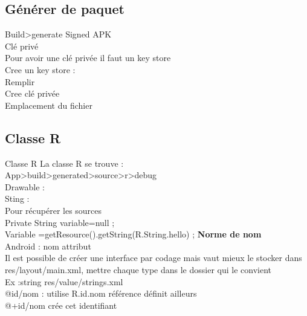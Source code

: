 \subsection{Générer de paquet}
Build>generate Signed APK\\ 
Clé privé\\
Pour avoir une clé privée il faut un key store\\
Cree un key store :\\
Remplir\\
Cree clé privée\\
Emplacement du fichier 
\subsection{Classe R} 
Classe R
La classe R se trouve :\\
App>build>generated>source>r>debug\\

Drawable :\\
Sting :\\
Pour récupérer les sources\\
Private String variable=null ;\\
Variable =getResource().getString(R.String.hello) ;
\textbf{Norme de nom}\\
Android : nom attribut\\
Il est possible de créer une interface par codage mais vaut mieux le stocker dans res/layout/main.xml, mettre chaque type dans le dossier qui le convient\\
Ex :string  res/value/strings.xml\\
@id/nom : utilise R.id.nom référence définit ailleurs\\
@+id/nom crée cet identifiant	\\
